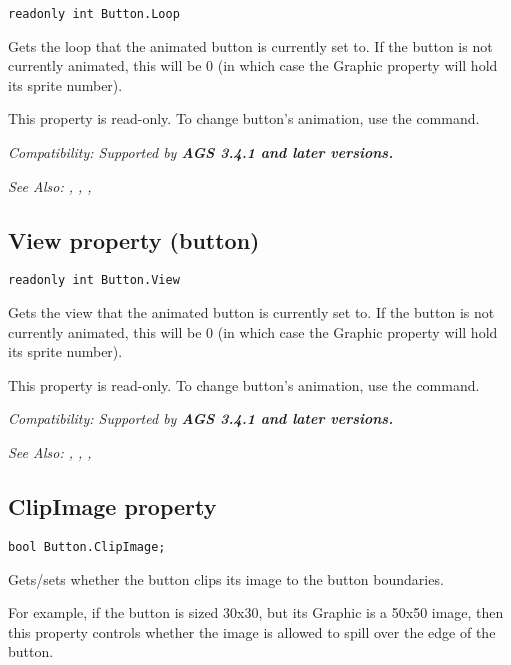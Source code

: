 \begin{verbatim}
readonly int Button.Loop
\end{verbatim}
Gets the loop that the animated button is currently set to. If the button is not currently
animated, this will be 0 (in which case the Graphic property will
hold its sprite number).

This property is read-only. To change button's animation, use the
 command.

\it{Compatibility:} Supported by \bf{AGS 3.4.1} and later versions.

\it{See Also:} ,
,
,



\subsection{View property (button)}\label{Button.View}%

\begin{verbatim}
readonly int Button.View
\end{verbatim}
Gets the view that the animated button is currently set to. If the button is not currently
animated, this will be 0 (in which case the Graphic property will
hold its sprite number).

This property is read-only. To change button's animation, use the
 command.

\it{Compatibility:} Supported by \bf{AGS 3.4.1} and later versions.

\it{See Also:} ,
,
,


\subsection{ClipImage property}\label{Button.ClipImage}%

\begin{verbatim}
bool Button.ClipImage;
\end{verbatim}
Gets/sets whether the button clips its image to the button boundaries.

For example, if the button is sized 30x30, but its Graphic is a 50x50 image, then
this property controls whether the image is allowed to spill over the edge of the button.

